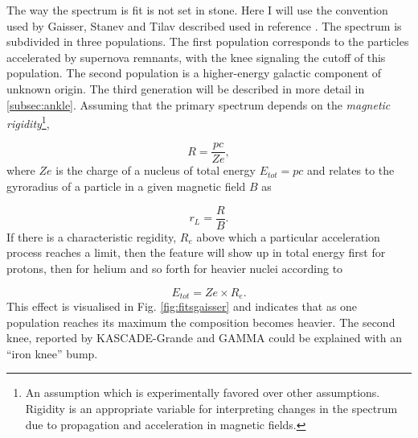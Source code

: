 The way the spectrum is fit is not set in stone. Here I will use the convention used by Gaisser, Stanev and Tilav described used in reference \cite{Gaisser:2013bla}. The spectrum is subdivided in three populations. The first population corresponds to the particles accelerated by supernova remnants, with the knee signaling the cutoff of this population. The second population is a higher-energy galactic component of unknown origin. The third generation will be described in more detail in \ref{subsec:ankle}. Assuming that the primary spectrum depends on the \textit{magnetic rigidity}\footnote{An assumption which is experimentally favored over other assumptions. Rigidity is an appropriate variable for interpreting changes in the spectrum due to propagation and acceleration in magnetic fields.},

\begin{equation}
R = \frac{pc}{Ze},
\end{equation}
where $Ze$ is the charge of a nucleus of total energy $E_{tot} = pc$ and relates to the gyroradius of a particle in a given magnetic field $B$ as

\begin{equation}
\label{eq:gyro}
r_L = \frac{R}{B}.
\end{equation}
If there is a characteristic regidity, $R_e$ above which a particular acceleration process reaches a limit, then the feature will show up in total energy first for protons, then for helium and so forth for heavier nuclei according to

\begin{equation}
E_{tot} = Ze \times R_e.
\end{equation}
This effect is visualised in Fig. \ref{fig:fitsgaisser} and indicates that as one population reaches its maximum the composition becomes heavier. The second knee, reported by KASCADE-Grande \cite{Apel:2011mi} and GAMMA \cite{Garyaka:2008gs} could be explained with an ``iron knee'' bump.


